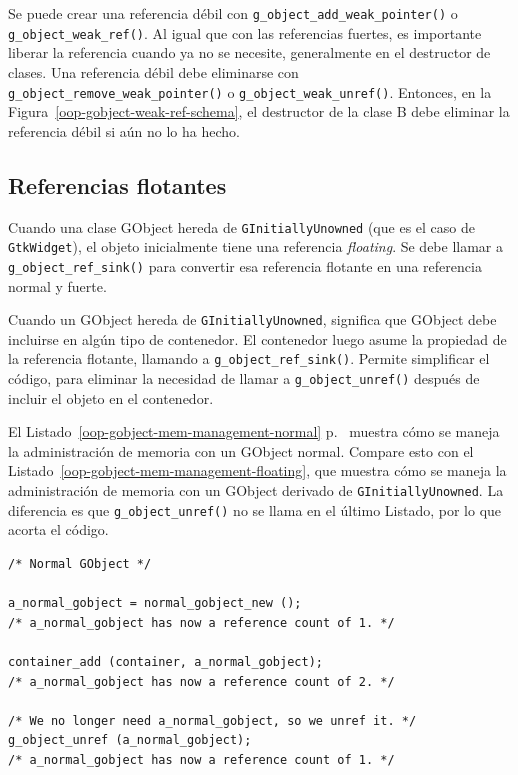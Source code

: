 Se puede crear una referencia débil con \lstinline{g_object_add_weak_pointer()} o \lstinline{g_object_weak_ref()}. Al igual que con las referencias fuertes, es importante liberar la referencia cuando ya no se necesite, generalmente en el destructor de clases. Una referencia débil debe eliminarse con \lstinline{g_object_remove_weak_pointer()} o \lstinline{g_object_weak_unref()}. Entonces, en la Figura~\ref{oop-gobject-weak-ref-schema}, el destructor de la clase B debe eliminar la referencia débil si aún no lo ha hecho.

\subsection{Referencias flotantes}

Cuando una clase GObject hereda de \lstinline{GInitiallyUnowned} (que es el caso de \lstinline{GtkWidget}), el objeto inicialmente tiene una referencia \emph{floating}. Se debe llamar a \lstinline{g_object_ref_sink()} para convertir esa referencia flotante en una referencia normal y fuerte.

Cuando un GObject hereda de \lstinline{GInitiallyUnowned}, significa que GObject debe incluirse en algún tipo de contenedor. El contenedor luego asume la propiedad de la referencia flotante, llamando a \lstinline{g_object_ref_sink()}. Permite simplificar el código, para eliminar la necesidad de llamar a \lstinline{g_object_unref()} después de incluir el objeto en el contenedor.

El Listado~\ref{oop-gobject-mem-management-normal} p.~\pageref{oop-gobject-mem-management-normal} muestra cómo se maneja la administración de memoria con un GObject normal. Compare esto con el Listado~\ref{oop-gobject-mem-management-floating}, que muestra cómo se maneja la administración de memoria con un GObject derivado de \lstinline{GInitiallyUnowned}. La diferencia es que \lstinline{g_object_unref()} no se llama en el último Listado, por lo que acorta el código.

\begin{lstlisting}[float=p, caption={Memory management of normal GObjects.}, label=oop-gobject-mem-management-normal]
/* Normal GObject */

a_normal_gobject = normal_gobject_new ();
/* a_normal_gobject has now a reference count of 1. */

container_add (container, a_normal_gobject);
/* a_normal_gobject has now a reference count of 2. */

/* We no longer need a_normal_gobject, so we unref it. */
g_object_unref (a_normal_gobject);
/* a_normal_gobject has now a reference count of 1. */
\end{lstlisting}

